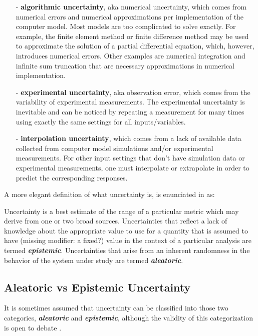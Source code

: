 \begin{itemize}
\begin{itemize}
\item[-] \textbf{algorithmic uncertainty}, aka numerical uncertainty, which comes from numerical errors and numerical approximations per implementation of the computer model. Most models are too complicated to solve exactly. For example, the finite element method or finite difference method may be used to approximate the solution of a partial differential equation, which, however, introduces numerical errors. Other examples are numerical integration and infinite sum truncation that are necessary approximations in numerical implementation. 
\item[-] \textbf{experimental uncertainty}, aka observation error, which comes from the variability of experimental measurements. The experimental uncertainty is inevitable and can be noticed by repeating a measurement for many times using exactly the same settings for all inputs/variables. 
\item[-] \textbf{interpolation uncertainty}, which comes from a lack of available data collected from computer model simulations and/or experimental measurements. For other input settings that don't have simulation data or experimental measurements, one must interpolate or extrapolate in order to predict the corresponding responses.
\end{itemize}
\end{itemize}

A more elegant definition of what uncertainty is, is enunciated in \cite{Helton2009} as:

\begin{defn}
Uncertainty is a best estimate of the range of a particular metric which may derive from one or two broad sources. Uncertainties that reflect a lack of knowledge about the appropriate value to use for a quantity that is assumed to have (missing modifier: a fixed?) value in the context of a particular analysis are termed \textbf{\textit{epistemic}}. Uncertainties that arise from an inherent randomness in the behavior of the system under study are termed \textbf{\textit{aleatoric}}.
\end{defn}

\subsection{Aleatoric vs Epistemic Uncertainty}

It is sometimes assumed that uncertainty can be classified into those two categories, \textbf{\textit{aleatoric}} and \textbf{\textit{epistemic}}, although the validity of this categorization is open to debate \cite{Kiureghian2009}. 

